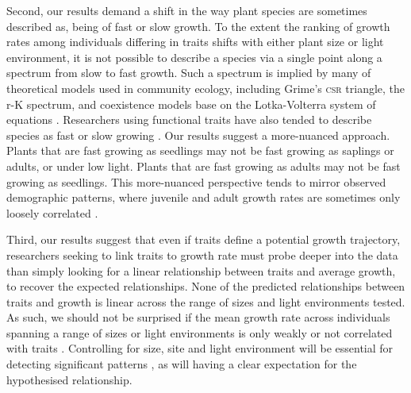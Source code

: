 \documentclass[a4paper,11pt]{article}
\begin{document}

Second, our results demand a shift in the way plant species are sometimes described as, being of fast or slow growth. To the extent the ranking of growth rates among individuals differing in traits shifts with either plant size or light environment, it is not possible to describe a species via a single point along a spectrum from slow to fast growth. Such a spectrum is implied by many of theoretical models used in community ecology, including Grime's \textsc{csr} triangle, the r-K spectrum, and coexistence models base on the Lotka-Volterra system of equations \citep[e.g.][]{Grime-1977,Chesson-2000}. Researchers using functional traits have also tended to describe species as fast or slow growing \citep[e.g.][]{Adler-2014, Diaz-2016}. Our results suggest a more-nuanced approach. Plants that are fast growing as seedlings may not be fast growing as saplings or adults, or under low light. Plants that are fast growing as adults may not be fast growing as seedlings. This more-nuanced perspective tends to mirror observed demographic patterns, where juvenile and adult growth rates are sometimes only loosely correlated \citep{Rees-2001}.

Third, our results suggest that even if traits define a potential growth trajectory, researchers seeking to link traits to growth rate must probe deeper into the data than simply looking for a linear relationship between traits and average growth, to recover the expected relationships. None of the predicted relationships between traits and growth is linear across the range of sizes and light environments tested. As such, we should not be surprised if the mean growth rate across individuals spanning a range of sizes or light environments is only weakly or not correlated with traits \citep[e.g.][]{Poorter-2008,Paine-2015}. Controlling for size, site and light environment will be essential for detecting significant patterns \citep[e.g.][]{Gibert-2016}, as will having a clear expectation for the hypothesised relationship.
\end{document}
